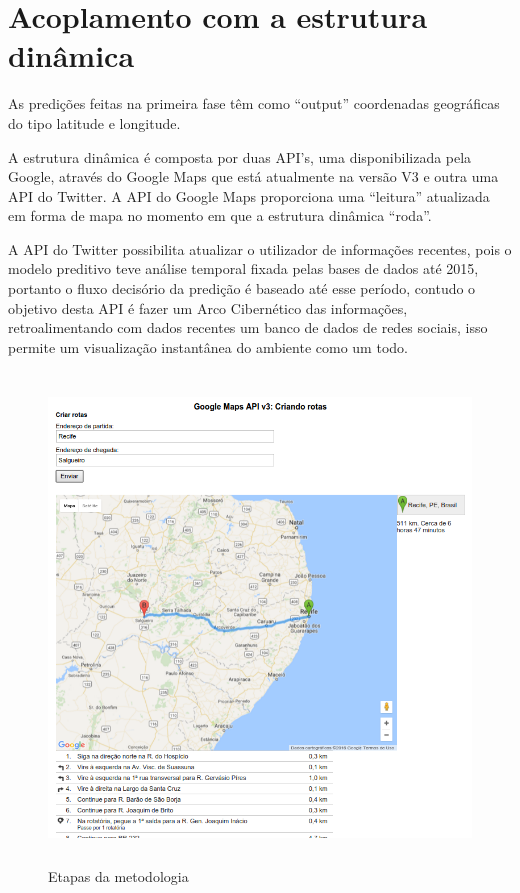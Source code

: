 \pagebreak

\section{Acoplamento com a estrutura dinâmica}

As predições feitas na primeira fase têm como ``output'' coordenadas geográficas do tipo latitude e longitude.

A estrutura dinâmica é composta por duas API's, uma disponibilizada pela Google, através do Google Maps que está atualmente na versão V3 e 
outra uma API do Twitter. A API do Google Maps proporciona uma ``leitura'' atualizada em forma de mapa no momento em que a estrutura dinâmica ``roda''.

A API do Twitter possibilita atualizar o utilizador de informações recentes, pois o modelo preditivo teve análise temporal fixada 
pelas bases de dados até 2015, portanto o fluxo decisório da predição é baseado até esse período, contudo o objetivo desta API é fazer 
um Arco Cibernético das informações, retroalimentando com dados recentes um banco de dados de redes sociais, isso permite um visualização 
instantânea do ambiente como um todo.





\begin{figure}[ht]
\centering
\caption{Etapas da metodologia}
\includegraphics[width=150mm, height=130mm]{Figuras/Cronograma/GoogleMaps.png}
\end{figure}